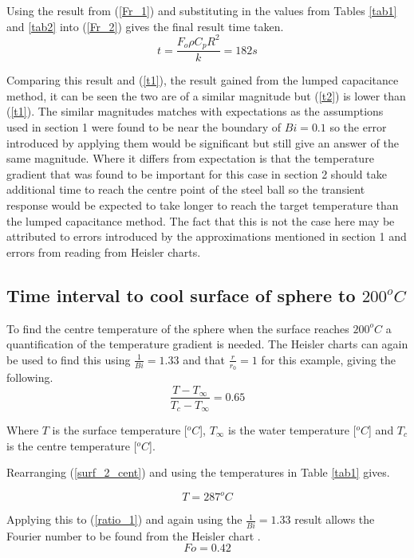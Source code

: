 \documentclass[11pt]{article}
\begin{document}
Using the result from (\ref{Fr_1}) and substituting in the values from Tables \ref{tab1} and \ref{tab2} into (\ref{Fr_2}) gives the final result time taken.
\boldmath
\begin{equation}\label{t2}
	t = \frac{F_{o}\rho C_{p} R^{2}}{k} = 182 s
\end{equation}
\unboldmath

Comparing this result and (\ref{t1}), the result gained from the lumped capacitance method, it can be seen the two are of a similar magnitude but (\ref{t2}) is lower than (\ref{t1}). The similar magnitudes matches with expectations as the assumptions used in section 1 were found to be near the boundary of $Bi = 0.1$ so the error introduced by applying them would be significant but still give an answer of the same magnitude. Where it differs from expectation is that the temperature gradient that was found to be important for this case in section 2 should take additional time to reach the centre point of the steel ball so the transient response would be expected to take longer to reach the target temperature than the lumped capacitance method. The fact that this is not the case here may be attributed to errors introduced by the approximations mentioned in section 1 and errors from reading from Heisler charts.

\subsection{Time interval to cool surface of sphere to $200 ^{o}C$}
To find the centre temperature of the sphere when the surface reaches $200 ^{o}C$ a quantification of the temperature gradient is needed. The Heisler charts can again be used to find this using $\frac{1}{Bi}=1.33$ and that $\frac{r}{r_{0}}= 1$ for this example, giving the following.
\begin{equation}\label{surf_2_cent}
	\frac{T - T_{\infty}}{T_{c}-T_{\infty}} = 0.65
\end{equation}

Where $T$ is the surface temperature [$^{o}C$], $T_{\infty}$ is the water temperature [$^{o}C$] and $T_c$ is the centre temperature [$^{o}C$].

Rearranging (\ref{surf_2_cent}) and using the temperatures in Table \ref{tab1} gives.

\begin{equation}\label{cent_temp}
	T = 287 ^{o}C
\end{equation}

Applying this to (\ref{ratio_1}) and again using the $\frac{1}{Bi}=1.33$ result allows the Fourier number to be found from the Heisler chart \cite{bergman_fundamentals_2011}.
\begin{equation}\label{fo_2}
	Fo = 0.42
\end{equation}
\end{document}
